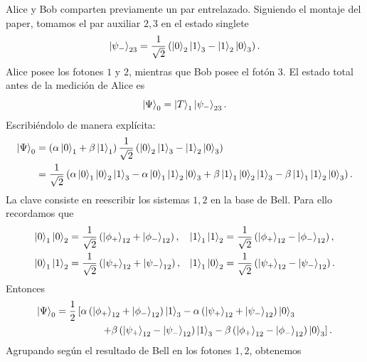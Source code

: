 \documentclass[12pt,a4paper]{article}
\theoremstyle{definition}
\theoremstyle{plain}
\theoremstyle{remark}
\begin{document}
Alice y Bob comparten previamente un par entrelazado. Siguiendo el montaje del paper, tomamos el par auxiliar $2,3$ en el estado singlete
\begin{equation*}
    \ket{\psi_-}_{23}
    =\frac{1}{\sqrt{2}}
    \left(
        \ket{0}_2\ket{1}_3-
        \ket{1}_2\ket{0}_3
    \right).
\end{equation*}
Alice posee los fotones $1$ y $2$, mientras que Bob posee el fotón $3$. El estado total antes de la medición de Alice es
\begin{equation*}
    \ket{\Psi}_0
    =\ket{T}_1\ket{\psi_-}_{23}.
\end{equation*}
Escribiéndolo de manera explícita:
\begin{align*}
    \ket{\Psi}_0
    &=
    \left(
        \alpha\ket{0}_1+\beta\ket{1}_1
    \right)
    \frac{1}{\sqrt{2}}
    \left(
        \ket{0}_2\ket{1}_3-
        \ket{1}_2\ket{0}_3
    \right)\notag\\
    &=
    \frac{1}{\sqrt{2}}
    \left(
        \alpha\ket{0}_1\ket{0}_2\ket{1}_3
        -\alpha\ket{0}_1\ket{1}_2\ket{0}_3
        +\beta\ket{1}_1\ket{0}_2\ket{1}_3
        -\beta\ket{1}_1\ket{1}_2\ket{0}_3
    \right).
\end{align*}
La clave consiste en reescribir los sistemas $1,2$ en la base de Bell. Para ello recordamos que
\begin{align*}
    \ket{0}_1\ket{0}_2
    &=\frac{1}{\sqrt{2}}
    \left(\ket{\phi_+}_{12}+\ket{\phi_-}_{12}\right),
    &
    \ket{1}_1\ket{1}_2
    &=\frac{1}{\sqrt{2}}
    \left(\ket{\phi_+}_{12}-\ket{\phi_-}_{12}\right),\\
    \ket{0}_1\ket{1}_2
    &=\frac{1}{\sqrt{2}}
    \left(\ket{\psi_+}_{12}+\ket{\psi_-}_{12}\right),
    &
    \ket{1}_1\ket{0}_2
    &=\frac{1}{\sqrt{2}}
    \left(\ket{\psi_+}_{12}-\ket{\psi_-}_{12}\right).
\end{align*}
Entonces
\begin{align*}
    \ket{\Psi}_0
    &=\frac{1}{2}
    \left[
        \alpha
        \left(\ket{\phi_+}_{12}+\ket{\phi_-}_{12}\right)
        \ket{1}_3
        -\alpha
        \left(\ket{\psi_+}_{12}+\ket{\psi_-}_{12}\right)
        \ket{0}_3
    \right.\\
    &\hspace{1.6cm}
    \left.
        +\beta
        \left(\ket{\psi_+}_{12}-\ket{\psi_-}_{12}\right)
        \ket{1}_3
        -\beta
        \left(\ket{\phi_+}_{12}-\ket{\phi_-}_{12}\right)
        \ket{0}_3
    \right].
\end{align*}
Agrupando según el resultado de Bell en los fotones $1,2$, obtenemos
\end{document}
